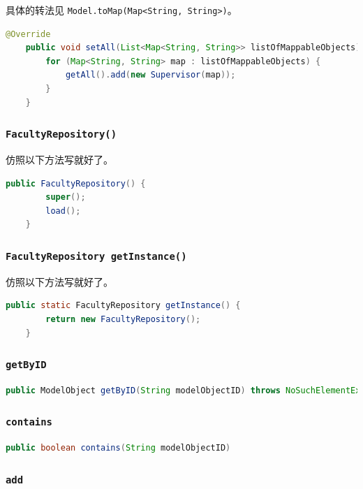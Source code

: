 \documentclass[hyperref,UTF8,12pt,a4paper]{ctexart}
\begin{document}
具体的转法见 \texttt{Model.toMap(Map<String, String>)}。

\begin{lstlisting}[language=Java]
    @Override
    public void setAll(List<Map<String, String>> listOfMappableObjects) {
        for (Map<String, String> map : listOfMappableObjects) {
            getAll().add(new Supervisor(map));
        }
    }
\end{lstlisting}

\subsubsection{\texttt{FacultyRepository()}}

仿照以下方法写就好了。

\begin{lstlisting}[language=Java]
	public FacultyRepository() {
		super();
		load();
	}
\end{lstlisting}

\subsubsection{\texttt{FacultyRepository getInstance()}}

仿照以下方法写就好了。

\begin{lstlisting}[language=Java]
	public static FacultyRepository getInstance() {
		return new FacultyRepository();
	}
\end{lstlisting}

\subsubsection{\texttt{getByID}}

\begin{lstlisting}[language=Java]
    public ModelObject getByID(String modelObjectID) throws NoSuchElementException
\end{lstlisting}

\subsubsection{\texttt{contains}}

\begin{lstlisting}[language=Java]
	public boolean contains(String modelObjectID)
\end{lstlisting}

\subsubsection{\texttt{add}}
\end{document}
